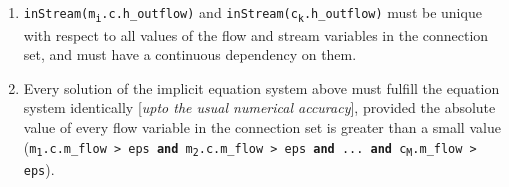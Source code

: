 \begin{enumerate}
\item
  \texttt{inStream(m\textsubscript{i}.c.h\_outflow)} and
  \texttt{inStream(c\textsubscript{k}.h\_outflow)} must be unique with
  respect to all values of the flow and stream variables in the
  connection set, and must have a continuous dependency on them.
\item
  Every solution of the implicit equation system above must fulfill the
  equation system identically {[}\emph{upto the usual numerical
  accuracy}{]}, provided the absolute value of every flow variable in
  the connection set is greater than a small value
  (\texttt{\textbar{}m\textsubscript{1}.c.m\_flow\textbar{} \textgreater{} eps
  \textbf{and} \textbar{}m\textsubscript{2}.c.m\_flow\textbar{}
  \textgreater{} eps \textbf{and} ... \textbf{and}
  \textbar{}c\textsubscript{M}.m\_flow\textbar{} \textgreater{} eps}).
\end{enumerate}

